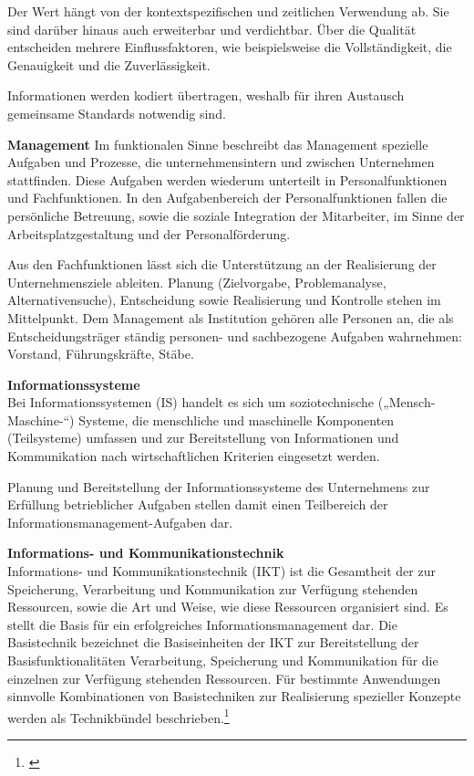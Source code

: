 Der Wert hängt von der kontextspezifischen und zeitlichen Verwendung ab. Sie sind darüber hinaus auch erweiterbar und verdichtbar. Über die Qualität entscheiden mehrere Einflussfaktoren, wie beispielsweise die Vollständigkeit, die Genauigkeit und die Zuverlässigkeit.

Informationen werden kodiert übertragen, weshalb für ihren Austausch gemeinsame Standards notwendig sind.

\textbf{Management}
Im funktionalen Sinne beschreibt das Management spezielle Aufgaben und Prozesse, die unternehmensintern und zwischen Unternehmen stattfinden.
Diese Aufgaben werden wiederum unterteilt in Personalfunktionen und Fachfunktionen. In den Aufgabenbereich der Personalfunktionen fallen die persönliche Betreuung, sowie die soziale Integration der Mitarbeiter, im Sinne der Arbeitsplatzgestaltung und der Personalförderung.

Aus den Fachfunktionen lässt sich die Unterstützung an der Realisierung der Unternehmensziele ableiten. Planung (Zielvorgabe, Problemanalyse, Alternativensuche), Entscheidung sowie Realisierung und Kontrolle stehen im Mittelpunkt.
Dem Management als Institution gehören alle Personen an, die als Entscheidungsträger ständig personen- und sachbezogene Aufgaben wahrnehmen: Vorstand, Führungskräfte, Stäbe.

\textbf{Informationssysteme}\\
Bei Informationssystemen (IS) handelt es sich um soziotechnische („Mensch-Maschine-“) Systeme, die menschliche und maschinelle Komponenten (Teilsysteme) umfassen und zur Bereitstellung von Informationen und Kommunikation nach wirtschaftlichen Kriterien eingesetzt werden.

Planung und Bereitstellung der Informationssysteme des Unternehmens zur Erfüllung betrieblicher Aufgaben stellen damit einen Teilbereich der Informationsmanagement-Aufgaben dar. 

\textbf{Informations- und Kommunikationstechnik}\\
Informations- und Kommunikationstechnik (IKT) ist die Gesamtheit der zur Speicherung, Verarbeitung und Kommunikation zur Verfügung stehenden Ressourcen, sowie die Art und Weise, wie diese Ressourcen organisiert sind.
Es stellt die Basis für ein erfolgreiches Informationsmanagement dar.
Die Basistechnik bezeichnet die Basiseinheiten der IKT zur Bereitstellung der Basisfunktionalitäten Verarbeitung, Speicherung und Kommunikation für die einzelnen zur Verfügung stehenden Ressourcen.
Für bestimmte Anwendungen sinnvolle Kombinationen von Basistechniken zur Realisierung spezieller Konzepte werden als Technikbündel beschrieben.\footnote{\cite{krcmar_einfuhrung_2015}}

